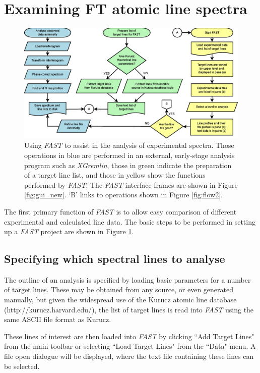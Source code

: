 \documentclass[a4paper,12pt]{report}
\newcommand{\fast}{\emph{FAST} }
\begin{document}
\section{Examining FT atomic line spectra}

\begin{figure}\centering
\includegraphics[scale=0.30]{Fast_Flow1.eps}
\caption{Using \emph{FAST} to assist in the analysis of experimental spectra. Those operations in blue are performed in an external, early-stage analysis program such as \emph{XGremlin}, those in green indicate the preparation of a target line list, and those in yellow show the functions performed by \emph{FAST}. The \emph{FAST} interface frames are shown in Figure \ref{fig:gui_new}. `B' links to operations shown in Figure \ref{fig:flow2}.}
\label{fig:flow1}
\end{figure}

The first primary function of \fast is to allow easy comparison of different experimental and calculated line data. The basic steps to be performed in setting up a \fast project are shown in Figure \ref{fig:flow1}.

\subsection{Specifying which spectral lines to analyse}
The outline of an analysis is specified by loading basic parameters for a number of target lines. These may be obtained from any source, or even generated manually, but given the widespread use of the Kurucz atomic line database (http://kurucz.harvard.edu/), the list of target lines is read into \fast using the same ASCII file format as Kurucz.

These lines of interest are then loaded into \fast by clicking ``Add Target Lines" from the main toolbar or selecting ``Load Target Lines" from the ``Data" menu. A file open dialogue will be displayed, where the text file containing these lines can be selected.
\end{document}
